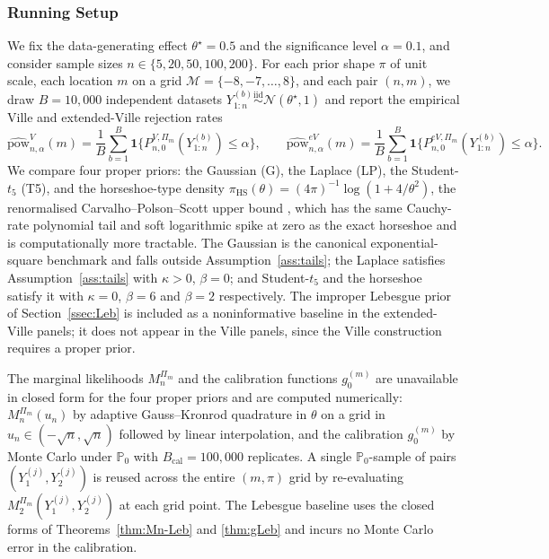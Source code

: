 \documentclass{article}%
\newcommand{\Prob}{\mathbb{P}}
\begin{document}
\subsubsection{Running Setup}
We fix the data-generating effect \(\theta^\star=0.5\) and the
significance level \(\alpha=0.1\), and consider sample sizes
\(n\in\{5,20,50,100,200\}\). For each prior shape \(\pi\) of unit scale,
each location \(m\) on a grid
\(\mathcal M=\{-8,-7,\ldots,8\}\), and each pair \((n,m)\), we draw
\(B=10{,}000\) independent datasets
\(Y_{1:n}^{(b)}\stackrel{\mathrm{iid}}{\sim}\mathcal N(\theta^\star,1)\)
and report the empirical Ville and extended-Ville rejection rates
\begin{equation}\label{eq:exp-power}
   \widehat{\mathrm{pow}}_{n,\alpha}^{V}(m)
   = \frac{1}{B}\sum_{b=1}^{B}
     \mathbf 1\!\bigl\{P_{n,0}^{V,\Pi_m}(Y_{1:n}^{(b)})\leq\alpha\bigr\},
   \qquad
   \widehat{\mathrm{pow}}_{n,\alpha}^{eV}(m)
   = \frac{1}{B}\sum_{b=1}^{B}
     \mathbf 1\!\bigl\{P_{n,0}^{eV,\Pi_m}(Y_{1:n}^{(b)})\leq\alpha\bigr\}.
\end{equation}
We compare four proper priors: the Gaussian (G), the Laplace (LP), the
Student-\(t_5\) (T5), and the horseshoe-type density
\(\pi_{\mathrm{HS}}(\theta)=(4\pi)^{-1}\log(1+4/\theta^2)\),
the renormalised Carvalho--Polson--Scott upper bound
\citep{Carvalho2010}, which has the same Cauchy-rate polynomial tail
and soft logarithmic spike at zero as the exact horseshoe and is
computationally more tractable. The Gaussian is the canonical
exponential-square benchmark and falls outside
Assumption~\ref{ass:tails}; the Laplace satisfies Assumption~\ref{ass:tails}
with \(\kappa>0\), \(\beta=0\); and Student-\(t_5\) and the horseshoe
satisfy it with \(\kappa=0\), \(\beta=6\) and \(\beta=2\) respectively.
The improper Lebesgue prior of Section~\ref{ssec:Leb} is included as a
noninformative baseline in the extended-Ville panels; it does not appear
in the Ville panels, since the Ville construction requires a proper prior.

The marginal likelihoods \(M_n^{\Pi_m}\) and the
calibration functions \(g_{0}^{(m)}\) are unavailable in closed form for
the four proper priors and are computed numerically: \(M_n^{\Pi_m}(u_n)\)
by adaptive Gauss--Kronrod quadrature in \(\theta\) on a grid in
\(u_n\in(-\sqrt n,\sqrt n)\) followed by linear interpolation, and the
calibration \(g_{0}^{(m)}\) by Monte Carlo under \(\Prob_0\) with
\(B_{\mathrm{cal}}=100{,}000\) replicates. A single \(\Prob_0\)-sample
of pairs \((Y_1^{(j)},Y_2^{(j)})\) is reused across the entire
\((m,\pi)\) grid by re-evaluating
\(M_2^{\Pi_m}(Y_1^{(j)},Y_2^{(j)})\) at each grid point. The Lebesgue
baseline uses the closed forms of Theorems~\ref{thm:Mn-Leb}
and \ref{thm:gLeb} and incurs no Monte Carlo error in the calibration.
\end{document}
